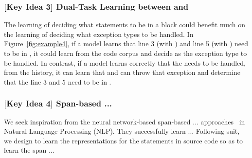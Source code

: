\subsubsection{{\bf [Key Idea 3] Dual-Task Learning between {\xstate} and {\xtype}}} The learning of deciding what statements to be in a 
block could benefit much on the learning of deciding what exception
types to be handled. In Figure~\ref{fig:example4}, if a model learns
that line 3 (with ) and line 5 (with
) need to be in , it could learn from
the code corpus and decide  as the exception type to
be handled. In contrast, if a model learns correctly that the
 needs to be handled, from the history, it can learn
that  and  can throw that
exception and determine that the line 3 and 5 need to be in
.

\subsubsection{{\bf [Key Idea 4] Span-based ...}}
We seek inspiration from the neural network-based span-based ...
approaches~\cite{?} in Natural Language Processing (NLP). They
successfully learn ... Following suit, we design \tool to learn the
representations for the statements in source code so as to learn the
span ...


